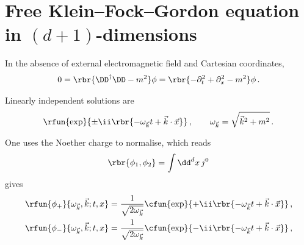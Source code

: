 \documentclass[a4paper]{article}
\numberwithin{equation}{section}
\begin{document}
\section{Free Klein--Fock--Gordon equation in $(d+1)$-dimensions}

In the absence of external electromagnetic field and Cartesian coordinates,
\begin{align}
0 = \rbr{\DD^{\dagger} \DD - m^2}\phi =
	\rbr{-\partial_t^2+\partial_x^2 - m^2}\phi\,.
\end{align}

Linearly independent solutions are
\begin{align}
\rfun{\exp}{\pm\ii\rbr{-\omega_{\vec{k}} t + \vec{k}\cdot\vec{x}}}\,,
\qquad
\omega_{\vec{k}} = \sqrt{\vec{k}^2 + m^2}\,.
\end{align}

One uses the Noether charge to normalise, which reads
\begin{align}
\rbr{\phi_1, \phi_2} = \int \dd^d x\, j^{0}
\end{align}
gives
\begin{align}
\begin{split}
\rfun{\phi_{+}}{\omega_{\vec{k}},\vec{k}; t, x} &= 
\frac{1}{\sqrt{2\omega_{\vec{k}}}}
\cfun{\exp}{+\ii\rbr{-\omega_{\vec{k}} t + \vec{k}\cdot\vec{x}}}\,,
\\
\rfun{\phi_{-}}{\omega_{\vec{k}},\vec{k}; t, x} &=
\frac{1}{\sqrt{2\omega_{\vec{k}}}}
\cfun{\exp}{-\ii\rbr{-\omega_{\vec{k}} t + \vec{k}\cdot\vec{x}}}\,,
\end{split}
\end{align}
\end{document}
